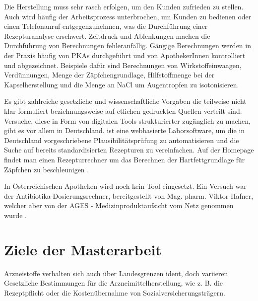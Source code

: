 \documentclass[12pt,a4paper]{article}
\begin{document}
Die Herstellung muss sehr rasch erfolgen, um den Kunden zufrieden zu stellen. Auch wird häufig der Arbeitsprozess unterbrochen, um Kunden zu bedienen oder einen Telefonanruf entgegenzunehmen, was die Durchführung einer Rezepturanalyse erschwert. Zeitdruck und Ablenkungen machen die Durchführung von Berechnungen fehleranfällig. Gängige Berechnungen werden in der Praxis häufig von \ac{PKAs} durchgeführt und von ApothekerInnen kontrolliert und abgezeichnet. Beispiele dafür sind Berechnungen von Wirkstoffeinwaagen, Verdünnungen, Menge der Zäpfchengrundlage, Hilfstoffmenge bei der Kapselherstellung und die Menge an \ac{NaCl} um Augentropfen zu isotonisieren.




Es gibt zahlreiche gesetzliche und wissenschaftliche Vorgaben die teilweise nicht klar formuliert beziehnungsweise auf etlichen gedruckten Quellen verteilt sind. Versuche, diese in Form von digitalen Tools strukturierter zugänglich zu machen, gibt es vor allem in Deutschland.  ist eine webbasierte Laborsoftware, um die in Deutschland vorgeschriebene Plausibilitätsprüfung zu automatisieren und die Suche auf bereits standardisierten Rezepturen zu vereinfachen. Auf der  Homepage findet man einen Rezepturrechner um das Berechnen der Hartfettgrundlage für Zäpfchen zu beschleunigen \cite{Home.22.03.2022}.

In Österreichischen Apotheken wird noch kein Tool eingesetzt. Ein Versuch war der Antibiotika-Dosierungsrechner, bereitgestellt von Mag. pharm. Viktor Hafner, welcher aber von der AGES - Medizinproduktaufsicht vom Netz genommen wurde \cite{.22.03.2022}. %

  




\section{Ziele der Masterarbeit}



Arzneistoffe verhalten sich auch über Landesgrenzen ident, doch variieren Gesetzliche Bestimmungen für die Arzneimittelherstellung,  wie z. B. die Rezeptpflicht oder die Kostenübernahme von Sozialversicherungsträgern. 
\end{document}
